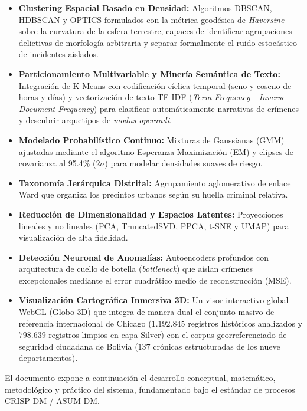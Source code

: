 \begin{itemize}
    \item \textbf{Clustering Espacial Basado en Densidad:} Algoritmos DBSCAN, HDBSCAN y OPTICS formulados con la métrica geodésica de \textit{Haversine} sobre la curvatura de la esfera terrestre, capaces de identificar agrupaciones delictivas de morfología arbitraria y separar formalmente el ruido estocástico de incidentes aislados.
    \item \textbf{Particionamiento Multivariable y Minería Semántica de Texto:} Integración de K-Means con codificación cíclica temporal (seno y coseno de horas y días) y vectorización de texto TF-IDF (\textit{Term Frequency - Inverse Document Frequency}) para clasificar automáticamente narrativas de crímenes y descubrir arquetipos de \textit{modus operandi}.
    \item \textbf{Modelado Probabilístico Continuo:} Mixturas de Gaussianas (GMM) ajustadas mediante el algoritmo Esperanza-Maximización (EM) y elipses de covarianza al 95.4\% ($2\sigma$) para modelar densidades suaves de riesgo.
    \item \textbf{Taxonomía Jerárquica Distrital:} Agrupamiento aglomerativo de enlace Ward que organiza los precintos urbanos según su huella criminal relativa.
    \item \textbf{Reducción de Dimensionalidad y Espacios Latentes:} Proyecciones lineales y no lineales (PCA, TruncatedSVD, PPCA, t-SNE y UMAP) para visualización de alta fidelidad.
    \item \textbf{Detección Neuronal de Anomalías:} Autoencoders profundos con arquitectura de cuello de botella (\textit{bottleneck}) que aíslan crímenes excepcionales mediante el error cuadrático medio de reconstrucción (MSE).
    \item \textbf{Visualización Cartográfica Inmersiva 3D:} Un visor interactivo global WebGL (Globo 3D) que integra de manera dual el conjunto masivo de referencia internacional de Chicago ($1.192.845$ registros históricos analizados y $798.639$ registros limpios en capa Silver) con el corpus georreferenciado de seguridad ciudadana de Bolivia ($137$ crónicas estructuradas de los nueve departamentos).
\end{itemize}

El documento expone a continuación el desarrollo conceptual, matemático, metodológico y práctico del sistema, fundamentado bajo el estándar de procesos CRISP-DM / ASUM-DM.

